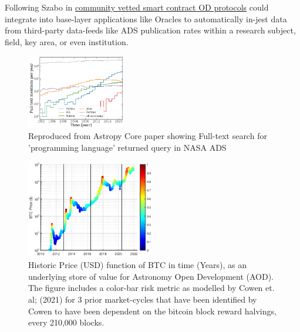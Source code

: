 \documentclass[final,5p,times,twocolumn,authoryear]{elsarticle}
\begin{document}
Following Szabo in \href{https://www.fon.hum.uva.nl/rob/Courses/InformationInSpeech/CDROM/Literature/LOTwinterschool2006/szabo.best.vwh.net/smart.contracts.html}{community vetted smart contract OD protocols} could integrate into base-layer applications like Oracles to automatically in-jest data from third-party data-feeds like ADS publication rates within a research subject, field, key area,  or even institution.


\begin{figure}
    \centering
    \label{fig:astropy}
    \includegraphics[width=0.38\textwidth]{figs/2206.14220.jpg}
    \vspace*{-0.3cm}
    \caption{Reproduced from Astropy Core paper showing Full-text search for 'programming language' returned query in NASA ADS}
\end{figure}

 \begin{figure}[h!]
    \centering
    \label{fig:cowen}
  \caption{Historic Price (USD) function of BTC in time (Years), as an underlying store of value for Astronomy Open Development (AOD). The figure includes a color-bar risk metric as modelled by Cowen et. al; (2021) for 3 prior market-cycles that have been identified by Cowen to have been dependent on the bitcoin block reward halvings, every 210,000 blocks.}
  \includegraphics[width=0.5\textwidth]{figs/cowen2.eps}
\end{figure}
\end{document}
